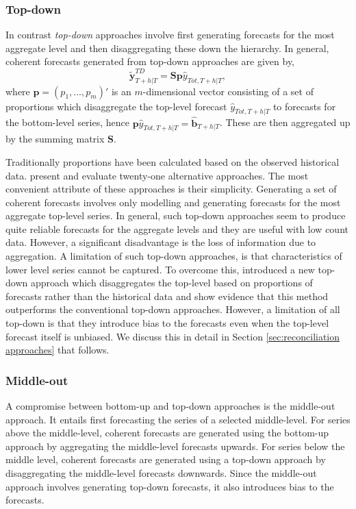 \documentclass[graybox]{svmult}
\begin{document}
\subsubsection{Top-down}

In contrast \textit{top-down} approaches involve first generating forecasts for the most aggregate level and then disaggregating these down the hierarchy. In general, coherent forecasts generated from top-down approaches are given by,
\begin{equation*}
\tilde{\bm{y}}^{TD}_{T+h|T}=\bm{S}\bm{p}\hat{y}_{Tot, T+h|T},
\end{equation*}
where $\bm{p} = (p_1,...,p_m)'$ is an $m$-dimensional vector consisting of a set of proportions which disaggregate the top-level forecast $\hat{y}_{Tot, T+h|T}$ to forecasts for the bottom-level series, hence $\bm{p}\hat{y}_{Tot, T+h|T}=\bm{\hat{\bm{b}}}_{T+h|T}$. These are then aggregated up by the summing matrix $\bm{S}$.

Traditionally proportions have been calculated based on the observed historical data. \cite{gross1990} present and evaluate twenty-one alternative approaches. The most convenient attribute of these approaches is their simplicity. Generating a set of coherent forecasts involves only modelling and generating forecasts for the most aggregate top-level series. In general, such top-down approaches seem to produce quite reliable forecasts for the aggregate levels and they are useful with low count data. However, a significant disadvantage is the loss of information due to aggregation. A limitation of such top-down approaches, is that characteristics of lower level series cannot be captured. To overcome this, \cite{AthEtAl2009} introduced a new top-down approach which disaggregates the top-level based on proportions of forecasts rather than the historical data and show evidence that this method outperforms the conventional top-down approaches. However, a limitation of all top-down is that they introduce bias to the forecasts even when the top-level forecast itself is unbiased. We discuss this in detail in Section \ref{sec:reconciliation approaches} that follows.

\subsubsection{Middle-out}

A compromise between bottom-up and top-down approaches is the middle-out approach. It entails first forecasting the series of a selected middle-level. For series above the middle-level, coherent forecasts are generated using the bottom-up approach by aggregating the middle-level forecasts upwards. For series below the middle level, coherent forecasts are generated using a top-down approach by disaggregating the middle-level forecasts downwards. Since the middle-out approach involves generating top-down forecasts, it also introduces bias to the forecasts.
\end{document}
